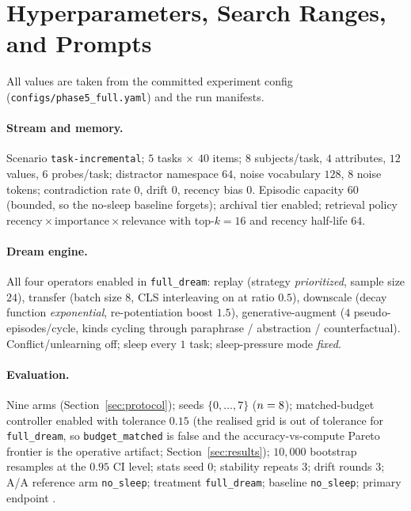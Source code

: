 \section{Hyperparameters, Search Ranges, and Prompts}\label{app:hyper}

All values are taken from the committed experiment config
(\texttt{configs/phase5\_full.yaml}) and the run manifests.

\paragraph{Stream and memory.} Scenario \texttt{task-incremental}; $5$ tasks
$\times$ $40$ items; $8$ subjects/task, $4$ attributes, $12$ values, $6$
probes/task; distractor namespace $64$, noise vocabulary $128$, $8$ noise
tokens; contradiction rate $0$, drift $0$, recency bias $0$. Episodic capacity
$60$ (bounded, so the no-sleep baseline forgets); archival tier enabled;
retrieval policy recency\,$\times$\,importance\,$\times$\,relevance with
top-$k=16$ and recency half-life $64$.

\paragraph{Dream engine.} All four operators enabled in \texttt{full\_dream}:
replay (strategy \emph{prioritized}, sample size $24$), transfer (batch size
$8$, CLS interleaving on at ratio $0.5$), downscale (decay function
\emph{exponential}, re-potentiation boost $1.5$), generative-augment
($4$ pseudo-episodes/cycle, kinds cycling through paraphrase / abstraction /
counterfactual). Conflict/unlearning off; sleep every $1$ task; sleep-pressure
mode \emph{fixed}.

\paragraph{Evaluation.} Nine arms (Section~\ref{sec:protocol}); seeds
$\{0,\dots,7\}$ ($n=8$); matched-budget controller enabled with tolerance
$0.15$ (the realised grid is out of tolerance for \texttt{full\_dream}, so
\texttt{budget\_matched} is false and the accuracy-vs-compute Pareto frontier is
the operative artifact; Section~\ref{sec:results});
$10{,}000$ bootstrap resamples at the $0.95$ CI level; stats seed $0$; stability
repeats $3$; drift rounds $3$; A/A reference arm \texttt{no\_sleep}; treatment
\texttt{full\_dream}; baseline \texttt{no\_sleep}; primary endpoint
\texttt{\SWprimaryEndpoint}.

